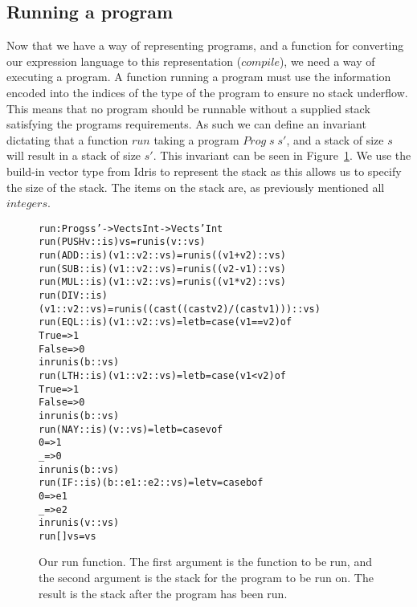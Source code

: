 \subsection{Running a program}
\label{sec:running_a_program}
Now that we have a way of representing programs, and a function for converting our expression language to this representation ($compile$), we need a way of executing a program. A function running a program must use the information encoded into the indices of the type of the program to ensure no stack underflow. This means that no program should be runnable without a supplied stack satisfying the programs requirements. As such we can define an invariant dictating that a function $run$ taking a program $Prog\;s\;s'$, and a stack of size $s$ will result in a stack of size $s'$. This invariant can be seen in Figure~\ref{fig:run_function}. We use the build-in vector type from Idris to represent the stack as this allows us to specify the size of the stack. The items on the stack are, as previously mentioned all $integers$. 

\begin{figure}
\begin{alltt}
run : Prog s s' -> Vect s Int -> Vect s' Int
run (PUSH v :: is) vs               = run is (v :: vs)
run (ADD    :: is) (v1 :: v2 :: vs) = run is ((v1 + v2) :: vs)
run (SUB    :: is) (v1 :: v2 :: vs) = run is ((v2 - v1) :: vs)
run (MUL    :: is) (v1 :: v2 :: vs) = run is ((v1 * v2) :: vs)
run (DIV    :: is) (v1 :: v2 :: vs) = run is ((cast ((cast v2) / (cast v1))) :: vs)
run (EQL    :: is) (v1 :: v2 :: vs) = let b = case (v1 == v2) of
                                                   True  => 1
                                                   False => 0
                                              in run is (b :: vs)
run (LTH    :: is) (v1 :: v2 :: vs) = let b = case (v1 < v2) of
                                                   True  => 1
                                                   False => 0
                                              in run is (b :: vs)
run (NAY    :: is)        (v :: vs) = let b = case v of
                                                   0 => 1
                                                   _ => 0
                                              in run is (b :: vs)
run (IF     :: is)        (b :: e1 :: e2 :: vs) = let v = case b of
                                                   0 => e1
                                                   _ => e2
                                              in run is (v :: vs)
run []             vs                 = vs
\end{alltt}
\caption{Our run function. The first argument is the function to be run, and the second argument is the stack for the program to be run on. The result is the stack after the program has been run.}
\label{fig:run_function}
\end{figure}

